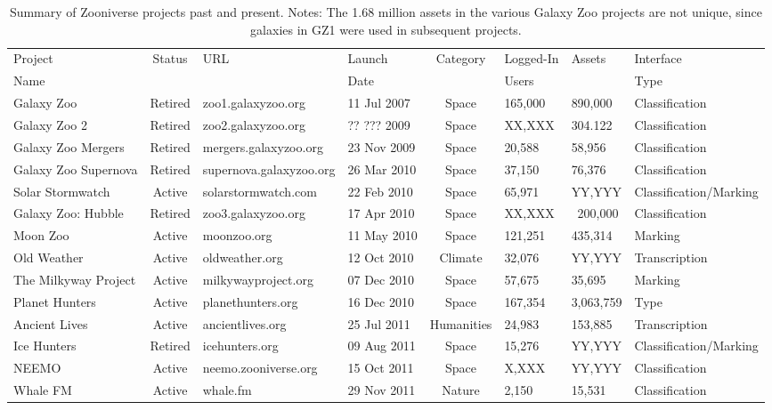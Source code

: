\documentclass{sigchi}
\begin{document}
\begin{table*}
\begin{center}
\caption{Summary of Zooniverse projects past and present.
Notes: The 1.68 million assets in the various Galaxy Zoo projects are not unique, since galaxies in GZ1 were used in subsequent projects.}
\begin{tabular}{lcllclll}
\hline
Project & Status & URL & Launch & Category & Logged-In & Assets & Interface \\
Name &  &  & Date &  & Users &  &  Type \\
\hline
\hline
Galaxy Zoo & Retired & zoo1.galaxyzoo.org & 11 Jul 2007 & Space & 165,000 & 890,000 & Classification \\
\hline
Galaxy Zoo 2 & Retired & zoo2.galaxyzoo.org & ?? ??? 2009 & Space & XX,XXX & 304.122 & Classification \\
Galaxy Zoo Mergers & Retired & mergers.galaxyzoo.org & 23 Nov 2009 & Space & 20,588 & 58,956 & Classification \\
\hline
Galaxy Zoo Supernova & Retired & supernova.galaxyzoo.org & 26 Mar 2010 & Space & 37,150 & 76,376 & Classification \\
Solar Stormwatch & Active & solarstormwatch.com & 22 Feb 2010 & Space & 65,971 & YY,YYY & Classification/Marking \\
Galaxy Zoo: Hubble & Retired & zoo3.galaxyzoo.org & 17 Apr 2010 & Space & XX,XXX & ~200,000 & Classification \\
Moon Zoo & Active & moonzoo.org & 11 May 2010 & Space & 121,251 & 435,314 & Marking \\
Old Weather & Active & oldweather.org & 12 Oct 2010 & Climate & 32,076 & YY,YYY & Transcription \\
The Milkyway Project & Active & milkywayproject.org & 07 Dec 2010 & Space & 57,675 & 35,695 & Marking \\
Planet Hunters & Active & planethunters.org & 16 Dec 2010 & Space & 167,354 & 3,063,759 & Type \\
\hline
Ancient Lives & Active & ancientlives.org & 25 Jul 2011 & Humanities & 24,983 & 153,885 & Transcription \\
Ice Hunters & Retired & icehunters.org & 09 Aug 2011 & Space & 15,276 & YY,YYY & Classification/Marking \\
NEEMO & Active & neemo.zooniverse.org & 15 Oct 2011 & Space & X,XXX & YY,YYY & Classification \\
Whale FM & Active & whale.fm & 29 Nov 2011 & Nature & 2,150 & 15,531 & Classification \\

\end{tabular}
\end{center}
\end{table*}
\end{document}
